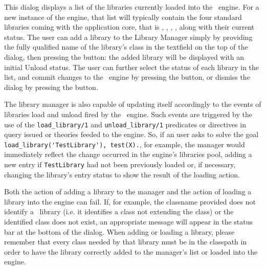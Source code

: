 This dialog displays a list of the libraries currently loaded into the \tuprolog\ engine. For a new instance of the
engine, that list will typically contain the four standard libraries coming with the application core, that is
, , , , along with their
current status. The user can add a library to the Library Manager simply by providing the fully qualified name of the
library's class in the textfield on the top of the dialog, then pressing the  button: the added library
will be displayed with an initial Unload status. The user can further select the status of each library in the list,
and commit changes to the \tuprolog\ engine by pressing the  button, or dismiss the dialog by pressing
the  button.

The library manager is also capable of updating itself accordingly to the events of libraries load and unload fired by
the \tuprolog\ engine.  Such events are triggered by the use of the \verb|load_library/1| and \verb|unload_library/1|
predicates or directives in query issued or theories feeded to the engine. So, if an user asks to solve the goal \verb|load_library('TestLibrary'), test(X).|,
for example, the manager would immediately reflect the change occurred in the engine's libraries pool, adding a new
entry if \verb|TestLibrary| had not been previously loaded or, if necessary, changing the library's entry status to
show the result of the loading action.

Both the action of adding a library to the manager and the action of loading a library into the engine can fail. If,
for example, the classname provided does not identify a \tuprolog\ library (i.e. it identifies a class not extending the
 class) or the identified class does not exist, an appropriate message will appear
in the status bar at the bottom of the dialog. When adding or loading a library, please remember that every class
needed by that library must be in the classpath in order to have the library correctly added to the manager's list or
loaded into the engine. 